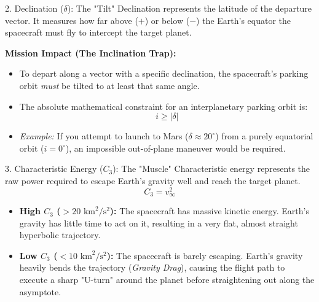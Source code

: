 \documentclass[11pt, aspectratio=169]{beamer}
\begin{document}
\begin{frame}{2. Declination ($\delta$): The "Tilt"}
    Declination represents the latitude of the departure vector. It measures how far above ($+$) or below ($-$) the Earth's equator the spacecraft must fly to intercept the target planet.
    
    \vspace{0.3cm}
    \textbf{Mission Impact (The Inclination Trap):}
    \begin{itemize}
        \item To depart along a vector with a specific declination, the spacecraft's parking orbit \textit{must} be tilted to at least that same angle. 
        \item The absolute mathematical constraint for an interplanetary parking orbit is:
        \begin{equation}
            i \ge |\delta|
        \end{equation}
        \item \textit{Example:} If you attempt to launch to Mars ($\delta \approx 20^\circ$) from a purely equatorial orbit ($i = 0^\circ$), an impossible out-of-plane maneuver would be required.
    \end{itemize}
\end{frame}

\begin{frame}{3. Characteristic Energy ($C_3$): The "Muscle"}
    Characteristic energy represents the raw power required to escape Earth's gravity well and reach the target planet. 
    \begin{equation}
        C_3 = v_\infty^2
    \end{equation}
    
    \vspace{0.3cm}
    \begin{itemize}
        \item \textbf{High $C_3$ ($> 20 \text{ km}^2/\text{s}^2$):} The spacecraft has massive kinetic energy. Earth's gravity has little time to act on it, resulting in a very flat, almost straight hyperbolic trajectory.
        \vspace{0.2cm}
        \item \textbf{Low $C_3$ ($< 10 \text{ km}^2/\text{s}^2$):} The spacecraft is barely escaping. Earth's gravity heavily bends the trajectory (\textit{Gravity Drag}), causing the flight path to execute a sharp "U-turn" around the planet before straightening out along the asymptote.
    \end{itemize}
\end{frame}
\end{document}
